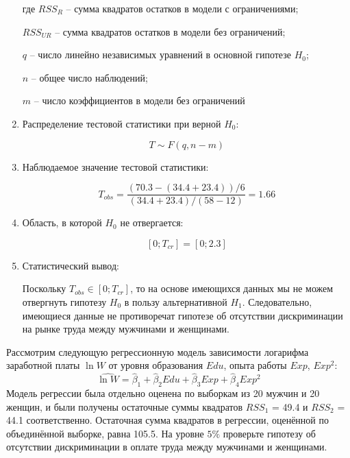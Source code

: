 \documentclass[pdftex,11pt,openany]{book}\usepackage[]{graphicx}\usepackage[]{color}
\begin{document}
\begin{solution}
\begin{enumerate}
где $RSS_R$ -- сумма квадратов остатков в модели с ограничениями;

$RSS_{UR}$ -- сумма квадратов остатков в модели без ограничений;

$q$ -- число линейно независимых уравнений в основной гипотезе $H_0$;

$n$ -- общее число наблюдений;

$m$ -- число коэффициентов в модели без ограничений

\item Распределение тестовой статистики при верной $H_0$:

\[
T \sim F(q,n-m)
\]

\item Наблюдаемое значение тестовой статистики:

\[
T_{obs} = \frac{(70.3-(34.4+23.4))/6}{(34.4+23.4)/(58-12)}=1.66
\]

\item Область, в которой $H_0$ не отвергается:

\[
[0;T_{cr}]=[0;2.3]
\]

\item Статистический вывод:

Поскольку $T_{obs} \in [0;T_{cr}]$, то на основе имеющихся данных мы не можем отвергнуть гипотезу $H_0$ в пользу альтернативной $H_1$. Следовательно, имеющиеся данные не противоречат гипотезе об отсутствии дискриминации на рынке труда между мужчинами и женщинами.

\end{enumerate}
\end{solution}

\begin{problem}
 Рассмотрим следующую регрессионную модель зависимости логарифма заработной платы $\ln W$ от уровня образования $Edu$, опыта работы $Exp$, $Exp^2$:
\[
\widehat{\ln W}=\hat{\beta}_1+\hat{\beta}_2Edu+\hat{\beta}_3Exp+\hat{\beta}_4Exp^2
\]
Модель регрессии была отдельно оценена по выборкам из 20 мужчин и 20 женщин, и были получены остаточные суммы квадратов $RSS_1$ = 49.4 и $RSS_2$ = 44.1 соответственно. Остаточная сумма квадратов в регрессии, оценённой по объединённой выборке, равна 105.5. На уровне $ 5\%$ проверьте гипотезу об отсутствии дискриминации в оплате труда между мужчинами и женщинами.
\end{problem}

\begin{solution}
\end{solution}
\end{document}

